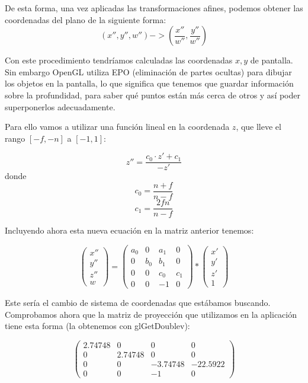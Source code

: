 \documentclass[a4paper,11pt, oneside]{book}
\begin{document}
De esta forma, una vez aplicadas las transformaciones afines, podemos obtener las coordenadas del plano de la siguiente forma:
\begin{equation}
(x'',y'',w'') -> (\frac{x''}{w''}, \frac{y''}{w''})
\end{equation}


Con este procedimiento tendríamos calculadas las coordenadas $x,y$ de pantalla. Sin embargo OpenGL utiliza EPO (eliminación de partes ocultas) para dibujar los objetos en la pantalla, lo que significa que tenemos que guardar información sobre la profundidad, para saber qué puntos están más cerca de otros y así poder superponerlos adecuadamente. 

Para ello vamos a  utilizar una función lineal en la coordenada $z$, que lleve el rango $[-f,-n]$ a $[-1,1]$:

\begin{equation}
z'' = \frac{c_0\cdot z'+c_1}{-z'}
\end{equation}
donde
\begin{equation}
c_0 = \frac{n+f}{n-f}
\end{equation}
\begin{equation}
c_1 = \frac{2fn}{n-f}
\end{equation}

Incluyendo ahora esta nueva ecuación en la matriz anterior tenemos:

$$\begin{pmatrix}
x''\\
y''\\
z'' \\
w
\end{pmatrix}=
\begin{pmatrix}
a_0 & 0&a_1&0\\
0&b_0&b_1&0\\
0&0&c_0&c_1\\
0&0&-1&0
\end{pmatrix}*
\begin{pmatrix}
x'\\
y'\\
z'\\
1
\end{pmatrix}
$$

Este sería el cambio de sistema de coordenadas que estábamos buscando. Comprobamos ahora que la matriz de proyección que utilizamos en la aplicación tiene esta forma (la obtenemos con glGetDoublev):

$$\begin{pmatrix}
2.74748 & 0&0&0\\
0&2.74748 &0&0\\
0&0&-3.74748&-22.5922\\
0&0&-1&0
\end{pmatrix}$$
\end{document}
